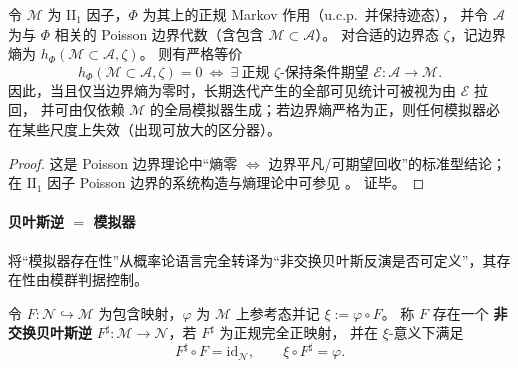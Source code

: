 \begin{theorem}\label{thm:op-algebra-poisson-boundary-entropy}
令 \(\mathcal{M}\) 为 \(\mathrm{II}_1\) 因子，\(\Phi\) 为其上的正规 Markov 作用（u.c.p.\ 并保持迹态），
并令 \(\mathcal{A}\) 为与 \(\Phi\) 相关的 Poisson 边界代数（含包含 \(\mathcal{M}\subset\mathcal{A}\)）。
对合适的边界态 \(\zeta\)，记边界熵为 \(h_\Phi(\mathcal{M}\subset\mathcal{A},\zeta)\)。
则有严格等价
\begin{equation}\label{eq:op-algebra-poisson-entropy-zero}
\boxed{\;
h_\Phi(\mathcal{M}\subset\mathcal{A},\zeta)=0
\ \Longleftrightarrow\
\exists\ \text{正规 }\zeta\text{-保持条件期望 }\mathcal{E}:\mathcal{A}\to\mathcal{M}.
\;}
\end{equation}
因此，当且仅当边界熵为零时，长期迭代产生的全部可见统计可被视为由 \(\mathcal{E}\) 拉回，
并可由仅依赖 \(\mathcal{M}\) 的全局模拟器生成；若边界熵严格为正，则任何模拟器必在某些尺度上失效（出现可放大的区分器）。
\end{theorem}

\begin{proof}
这是 Poisson 边界理论中“熵零 \(\Leftrightarrow\) 边界平凡/可期望回收”的标准型结论；
在 \(\mathrm{II}_1\) 因子 Poisson 边界的系统构造与熵理论中可参见 \cite{DasPeterson2022PoissonBoundariesII1}。
证毕。
\end{proof}

\paragraph{贝叶斯逆 \texorpdfstring{$=$}{=} 模拟器}
将“模拟器存在性”从概率论语言完全转译为“非交换贝叶斯反演是否可定义”，其存在性由模群判据控制。

\begin{definition}\label{def:op-algebra-bayesian-inverse}
令 \(F:\mathcal{N}\hookrightarrow\mathcal{M}\) 为包含映射，\(\varphi\) 为 \(\mathcal{M}\) 上参考态并记 \(\xi:=\varphi\circ F\)。
称 \(F\) 存在一个 \textbf{非交换贝叶斯逆} \(F^\sharp:\mathcal{M}\to\mathcal{N}\)，若 \(F^\sharp\) 为正规完全正映射，
并在 \(\xi\)-意义下满足
\begin{equation}\label{eq:op-algebra-bayes-inverse}
\boxed{\;F^\sharp\circ F=\mathrm{id}_{\mathcal{N}},\qquad \xi\circ F^\sharp=\varphi.\;}
\end{equation}
\end{definition}

